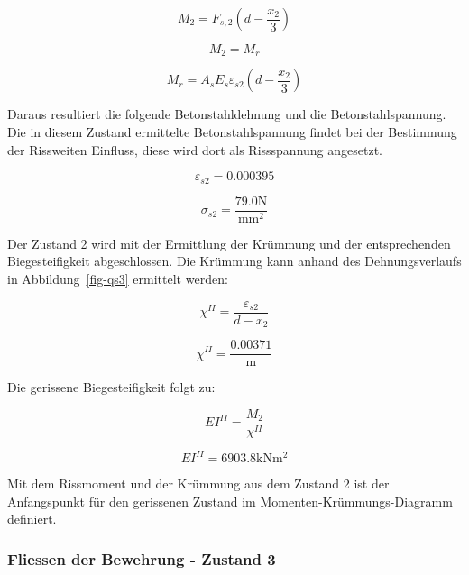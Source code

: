 \documentclass[
  12pt,
  letterpaper,
  egregdoesnotlikesansseriftitles]{scrreprt}
\begin{document}
\begin{equation}M_{2} = F_{s,2} \left(d - \frac{x_{2}}{3}\right)\end{equation}

\begin{equation}M_{2} = M_{r}\end{equation}

\begin{equation}M_{r} = A_{s} E_{s} \varepsilon_{s2} \left(d - \frac{x_{2}}{3}\right)\end{equation}

Daraus resultiert die folgende Betonstahldehnung und die
Betonstahlspannung. Die in diesem Zustand ermittelte Betonstahlspannung
findet bei der Bestimmung der Rissweiten Einfluss, diese wird dort als
Rissspannung angesetzt.

\begin{equation}\varepsilon_{s2} = 0.000395\end{equation}

\begin{equation}\sigma_{s 2} = \frac{79.0 \text{N}}{\text{mm}^{2}}\end{equation}

Der Zustand 2 wird mit der Ermittlung der Krümmung und der
entsprechenden Biegesteifigkeit abgeschlossen. Die Krümmung kann anhand
des Dehnungsverlaufs in Abbildung~\ref{fig-qs3} ermittelt werden:

\begin{equation}\chi^{II} = \frac{\varepsilon_{s2}}{d - x_{2}}\end{equation}

\begin{equation}\chi^{II} = \frac{0.00371}{\text{m}}\end{equation}

Die gerissene Biegesteifigkeit folgt zu:

\begin{equation}EI^{II} = \frac{M_{2}}{\chi^{II}}\end{equation}

\begin{equation}EI^{II} = 6903.8 \text{kN} \text{m}^{2}\end{equation}

Mit dem Rissmoment und der Krümmung aus dem Zustand 2 ist der
Anfangspunkt für den gerissenen Zustand im Momenten-Krümmungs-Diagramm
definiert.

\hypertarget{fliessen-der-bewehrung---zustand-3}{%
\subsubsection{Fliessen der Bewehrung - Zustand
3}\label{fliessen-der-bewehrung---zustand-3}}
\end{document}
